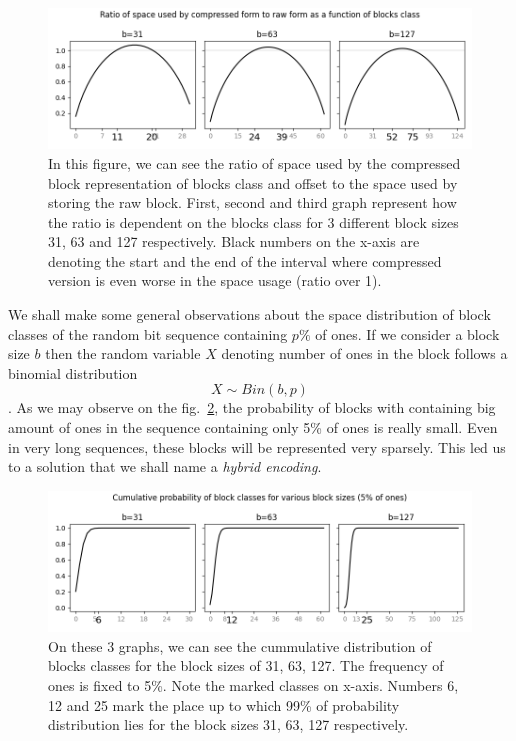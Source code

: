 \begin{figure}
	\centerline{
		\includegraphics[width=\textwidth]{images/rrr_space_savings}
	}
	\caption[TODO]{In this figure, we can see the ratio of space used by the compressed
    block representation of blocks class and offset to the space used by storing the raw
    block. First, second and third graph represent how the ratio is dependent on the blocks
    class for 3 different block sizes 31, 63 and 127 respectively. Black numbers on the x-axis
    are denoting the start and the end of the interval where compressed version is even worse
    in the space usage (ratio over 1).
	}
	\label{obr:rrrSpaceSavings}
\end{figure}

We shall make some general observations about the space distribution of block
classes of the random bit sequence containing $p\%$ of ones. If we consider a
block size $b$ then the random variable $X$ denoting number of ones in the
block follows a binomial distribution $$X \sim Bin(b,p)$$. As we may observe
on the fig.~\ref{obr:hybridEncodingDistribution}, the probability of blocks
with containing big amount of ones in the sequence containing only 5\% of ones
is really small. Even in very long sequences, these blocks will be represented
very sparsely. This led us to a solution that we shall name a \textit{hybrid encoding}.

\begin{figure}
	\centerline{
		\includegraphics[width=\textwidth]{images/hybrid_encoding_motivation}
	}
	\caption[TODO]{On these 3 graphs, we can see the cummulative distribution
    of blocks classes for the block sizes of 31, 63, 127. The frequency of ones is
    fixed to 5\%. Note the marked classes on x-axis. Numbers 6, 12 and
    25 mark the place up to which 99\% of probability distribution lies for
    the block sizes 31, 63, 127 respectively.
	}
	\label{obr:hybridEncodingDistribution}
\end{figure}

